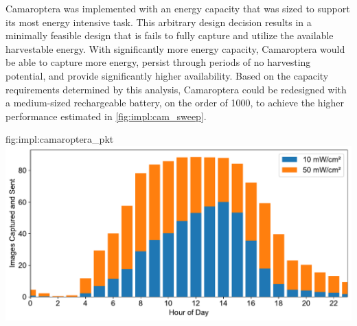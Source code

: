 Camaroptera was implemented with an energy capacity that was sized to support its most energy intensive task. This arbitrary design decision results in a minimally feasible design that is fails to fully capture and utilize the 
available harvestable energy.
With significantly more energy capacity, Camaroptera would be able to capture more energy, persist through periods of no harvesting potential, and provide significantly higher availability. 
Based on the capacity requirements determined by this analysis, Camaroptera could be redesigned with a medium-sized rechargeable battery, on the order of 1000\ssi{\Ah}, to achieve the higher performance estimated in \cref{fig:impl:cam_sweep}.

\begin{definefigure}{fig:impl:camaroptera_pkt}
    \centering
    \includegraphics[width=\linewidth]{figs/chap6/camaroptera_performance.pdf}
    \caption{
        The distribution of simulated Camaroptera transmitted image packets per hour in a day. 
        The distribution represents an average over the length of two synthesized outdoor traces (10 and 50\ssi[per-mode=symbol]{\milli\watt\per\centi\meter\squared}) based on the EnHANTs Setup D trace. 
        Camaroptera operation is limited to times when daylight is available, regardless of the scale of average input power. The average number of packets is significantly lower between 6PM and 6AM.
     }
\end{definefigure}

